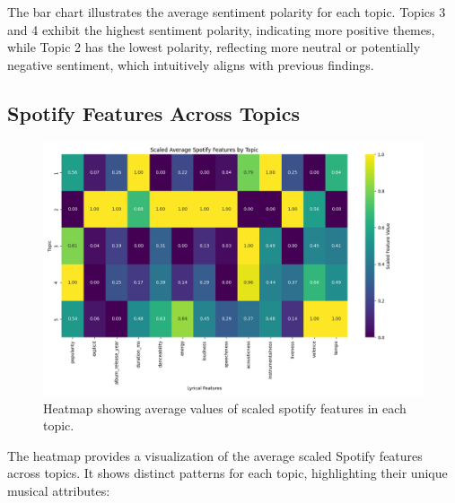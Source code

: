 The bar chart illustrates the average sentiment polarity for each topic. Topics
3 and 4 exhibit the highest sentiment polarity, indicating more positive
themes, while Topic 2 has the lowest polarity, reflecting more neutral or
potentially negative sentiment, which intuitively aligns with previous
findings.


\subsection{Spotify Features Across Topics}

\begin{center}
\begin{figure}[H]
  \centering
  \includegraphics[width=5in]{img/lda_spotify_features.png}
  \caption{Heatmap showing average values of scaled spotify features in each
  topic.}
  \label{Figure:fig_eh}
\end{figure}
\end{center}

The heatmap provides a visualization of the average scaled Spotify features
across topics. It shows distinct patterns for each topic, highlighting their
unique musical attributes:


